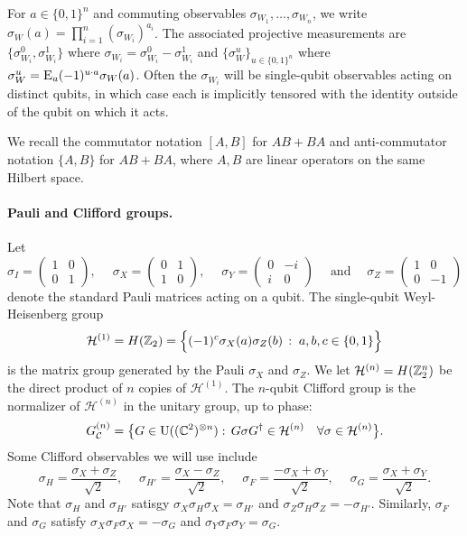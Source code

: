 \documentclass{toc}
\newcommand{\Es}[1]{\ensuremath{\mathop{\textsc{E}}}_{#1}} %
\newcommand{\setft}[1]{\mathrm{#1}}
\newcommand{\Unitary}{\setft{U}}
\newcommand{\heisg}{{\mathcal{H}^{(1)}}}
\newcommand{\heisgn}{{\mathcal{H}^{(n)}}}
\newcommand{\cliffordn}{G_\mathcal{C}^{(n)}}
\begin{document}
For $a\in\{0,1\}^n$ and commuting observables $\sigma_{W_1},\ldots,\sigma_{W_n}$, we write $\sigma_W(a) = \prod_{i=1}^n (\sigma_{W_i})^{a_i}$. The associated projective measurements are $\{\sigma_{W_i}^0,\sigma_{W_i}^1\}$ where $\sigma_{W_i} = \sigma_{W_i}^0 - \sigma_{W_i}^1$ and $\{\sigma_W^u\}_{u\in\{0,1\}^n}$ where $\sigma_W^u = \Es{a} (-1)^{u\cdot a} \sigma_W(a)$.  Often the $\sigma_{W_i}$ will be single-qubit observables acting on distinct qubits, in which case each is implicitly tensored with the identity outside of the qubit on which it acts. 

We recall the commutator notation $[A,B]$ for $AB+BA$ and anti-commutator notation $\{A,B\}$ for $AB+BA$, where $A,B$ are linear operators on the same Hilbert space. 


\paragraph{Pauli and Clifford groups.}
Let 
\begin{equation}\label{eq:pauli-matrix}
\sigma_I = \begin{pmatrix} 1 & 0 \\ 0 & 1 \end{pmatrix},\quad\; \sigma_X = \begin{pmatrix} 0 & 1 \\ 1 & 0 \end{pmatrix},\quad\; \sigma_Y = \begin{pmatrix} 0 & -i \\ i & 0 \end{pmatrix}\quad\;\text{and}\quad\; \sigma_Z = \begin{pmatrix} 1 & 0 \\ 0 & -1\end{pmatrix}
\end{equation}
denote the standard Pauli matrices acting on a qubit.  The single-qubit Weyl-Heisenberg group
$$\heisg = H(\Z_2)=\Big\{(-1)^c\sigma_X(a)\sigma_Z(b)\,:\;a,b,c\in\{0,1\}\Big\} $$
is the matrix group generated by the Pauli $\sigma_X$ and $\sigma_Z$. We let $\heisgn = H(\Z_2^n)$ be the direct product of $n$ copies of $\heisg$.  
The $n$-qubit Clifford group is the normalizer of $\heisgn$ in the unitary group, up to phase: 
$$\cliffordn = \big\{G\in\Unitary((\C^2)^{\otimes n}):\, G \sigma G^\dagger \in \heisgn \quad\forall \sigma \in \heisgn\big\}.$$
Some Clifford observables we will use include 
\begin{equation}\label{eq:pauli-matrix-2}
 \sigma_H = \frac{\sigma_X+\sigma_Z}{\sqrt{2}},\quad\; \sigma_{H'} = \frac{\sigma_X-\sigma_Z}{\sqrt{2}},\quad\; \sigma_F = \frac{-\sigma_X+\sigma_Y}{\sqrt{2}},\quad\; \sigma_{G} = \frac{\sigma_X+\sigma_Y}{\sqrt{2}}.
\end{equation}
Note that  $\sigma_H$ and $\sigma_{H'}$ satisgy $\sigma_X \sigma_H \sigma_X = \sigma_{H'}$ and $\sigma_Z \sigma_H \sigma_Z = -\sigma_{H'}$. Similarly, $\sigma_F$ and $\sigma_G$ satisfy $\sigma_X \sigma_F \sigma_X = -\sigma_G$ and $\sigma_Y \sigma_F \sigma_Y = \sigma_G$. 
\end{document}
